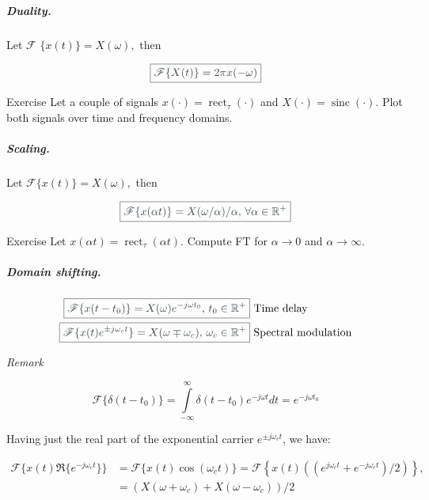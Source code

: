 \documentclass[17pt,a4paper]{extarticle}
\newcommand{\Real}{\mathbb{R}}\newcommand{\N}{\mathbb{N}}
\newcommand{\cita}[1]{\textcolor[rgb]{0.23, 0.27, 0.29}{\boxed{{\Large #1}}}}
\newcommand{\labelpethau}[1]{\texttt{#1}:}
\newlength\normalparindent
\newenvironment{pethau}%
{\begin{list}{}%
		{\renewcommand{\makelabel}{\labelpethau}%
			\setlength{\itemindent}{0pt}%
			\setlength{\leftmargin}{0pt}%
			\setlength{\labelwidth}{-1\normalparindent}%
			\addtolength{\topsep}{-0.5\parskip}%
			\listparindent \normalparindent
			\setlength{\parsep}{\parskip}}}%
	{\end{list}}
\begin{document}
\subparagraph{\textit{Duality. }} Let $\mathscr{F}$ $\{x(t)\}=X(\omega),$ then 
\begin{linenomath*}
	\begin{equation*}\cita{\mathscr{F}\{X(t)\}=2\pi x(-\omega)}
	\end{equation*} 
\end{linenomath*}

\begin{pethau}
	\item[Exercise] Let a couple of signals $x(\cdot)=\operatorname{rect}_{\tau}(\cdot)$ 
	and $X(\cdot)=\operatorname{sinc}(\cdot)$. Plot both signals over time and frequency domains. 
\end{pethau}

\subparagraph{\textit{Scaling. }} Let $\mathscr{F}\{x(t)\}=X(\omega),$ then 
\begin{linenomath*}\begin{equation*}\cita{\mathscr{F}\{x(\alpha t)\}= {X(\omega/\alpha)}/{\alpha},\,\forall \alpha\in\Real^{+}}\end{equation*}\end{linenomath*}

\begin{pethau}
	\item[Exercise] Let $x(\alpha t)=\operatorname{rect}_{\tau}(\alpha t)$. Compute FT for $\alpha\to 0$ and $\alpha\to\infty$.
\end{pethau}

\subparagraph{\textit{Domain shifting. } }
\begin{linenomath*}\begin{align*}
	\cita{\mathscr{F}\{x(t-t_{0})\}=X(\omega)e^{-j\omega t_{0}},\, t_0\in\Real^{+}}&\textrm{ Time delay}\\
		\cita{\mathscr{F}\{x(t)e^{\pm j\omega_{c}t}\}=X(\omega\mp\omega_{c}),\,\omega_{c}\in\Real^{+}}&\textrm{ Spectral modulation}
\end{align*} \end{linenomath*}

\textsl{Remark}
\begin{linenomath*}\begin{equation*}\mathscr{F}\{\delta(t-t_{0})\}={\displaystyle\int\limits_{-\infty}^{\infty}}
	\delta(t-t_{0})e^{-j\omega t}dt=e^{-j\omega t_{0}}\end{equation*} \end{linenomath*}
Having just the real part of the exponential carrier $e^{\pm j\omega_{c}t}$, we have:
\begin{linenomath*}\begin{align*}
	\mathscr{F}\{x(t)\Re\{e^{-j\omega_{c}t}\}\}&=\mathscr{F}\{x(t)\cos(\omega _{c}t)\}=\mathscr{F}\left\{
	x(t)\left( {(e^{j\omega_{c}t}+e^{-j\omega _{c}t})}/{2}\right) \right\} ,\\
	&= \left(
	X(\omega+\omega_{c})+X(\omega-\omega_{c})\right)/2 %
	\end{align*}\end{linenomath*}
\end{document}
